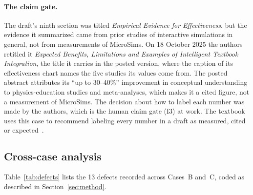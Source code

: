 \paragraph{The claim gate.} The draft's ninth section was titled \textit{Empirical
Evidence for Effectiveness}, but the evidence it summarized came from prior studies of
interactive simulations in general, not from measurements of MicroSims. On 18 October
2025 the authors retitled it \textit{Expected Benefits, Limitations and Examples of
Intelligent Textbook Integration}, the title it carries in the posted version, where the
caption of its effectiveness chart names the five studies its values come from. The posted abstract attributes its ``up to 30--40\%'' improvement in
conceptual understanding to physics-education studies and meta-analyses, which makes it a
cited figure, not a measurement of MicroSims. The decision about how to label each
number was made by the authors, which is the human claim gate (I3) at work. The textbook
uses this case to recommend labeling every number in a draft as measured, cited or
expected~\cite{mccreary2026aiforee}.

\subsection{Cross-case analysis}
\label{sec:cross-case}

Table~\ref{tab:defects} lists the 13 defects recorded across Cases~B and~C, coded as
described in Section~\ref{sec:method}.

